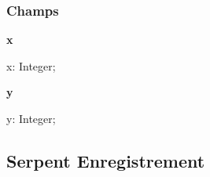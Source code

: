 \documentclass{report}
\newif\ifpdf
\begin{document}
\subsubsection*{\large{\textbf{Champs}}\normalsize\hspace{1ex}\hfill}
\begin{list}{}{
\setlength{\itemindent}{0cm}
\setlength{\listparindent}{0cm}
\setlength{\leftmargin}{\evensidemargin}
\addtolength{\leftmargin}{\tmplength}
\settowidth{\labelsep}{X}
\addtolength{\leftmargin}{\labelsep}
\setlength{\labelwidth}{\tmplength}
}
\label{Types.Position-x}
\item[\textbf{x}\hfill]
\ifpdf
\begin{flushleft}
\fi
\begin{ttfamily}
x: Integer;\end{ttfamily}

\ifpdf
\end{flushleft}
\fi


\par  \label{Types.Position-y}
\item[\textbf{y}\hfill]
\ifpdf
\begin{flushleft}
\fi
\begin{ttfamily}
y: Integer;\end{ttfamily}

\ifpdf
\end{flushleft}
\fi


\par  \end{list}
\ifpdf
\subsection*{\large{\textbf{Serpent Enregistrement}}\normalsize\hspace{1ex}\hrulefill}
\else
\subsection*{Serpent Enregistrement}
\fi
\label{Types.Serpent}
\end{document}
